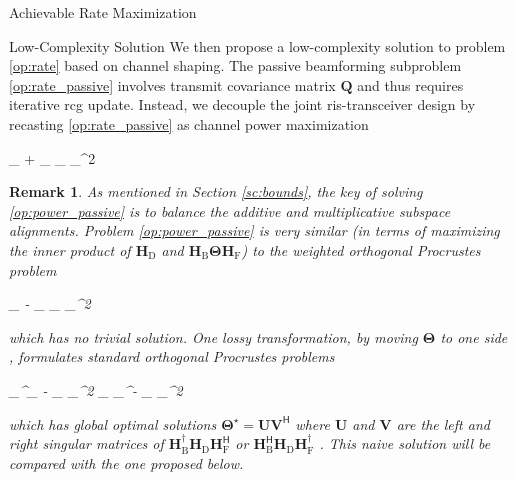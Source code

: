 \documentclass[journal]{IEEEtran}
\newtheorem{remark}{Remark}
\begin{document}
\begin{section}{Achievable Rate Maximization}
	\begin{subsection}{Low-Complexity Solution}\label{sc:low_complexity}
		We then propose a low-complexity solution to problem \eqref{op:rate} based on channel shaping.
		The passive beamforming subproblem \eqref{op:rate_passive} involves transmit covariance matrix $\mathbf{Q}$ and thus requires iterative \gls{rcg} update.
		Instead, we decouple the joint \gls{ris}-transceiver design by recasting \eqref{op:rate_passive} as channel power maximization
		\begin{maxi!}
			{\scriptstyle{\mathbf{\Theta}}}{\lVert {}_ + _ \mathbf{\Theta} _ \rVert _^2}{\label{op:power_passive}}{\label{ob:power_passive}}
		\end{maxi!}
		\begin{remark}
			As mentioned in Section \ref{sc:bounds}, the key of solving \eqref{op:power_passive} is to balance the additive and multiplicative subspace alignments.
			Problem \eqref{op:power_passive} is very similar (in terms of maximizing the inner product of $\mathbf{H}_\mathrm{D}$ and $\mathbf{H}_\mathrm{B} \mathbf{\Theta} \mathbf{H}_\mathrm{F}$) to the weighted orthogonal Procrustes problem \cite{Gower2004}
			\begin{mini!}
				{\scriptstyle{\mathbf{\Theta}}}{\lVert {}_ - _ \mathbf{\Theta} _\mathrm{F} \rVert _^2}{\label{op:weighted_orthogonal_procrustes}}{}
			\end{mini!}
			which has no trivial solution.
			One lossy transformation, by moving $\mathbf{\Theta}$ to one side \cite{Bell2003}, formulates standard orthogonal Procrustes problems
			\begin{mini!}
				{\scriptstyle{\mathbf{\Theta}}}{\lVert {}_^\dagger {}_ - \mathbf{\Theta} _\mathrm{F} \rVert _^2  \lVert \mathbf{H}_ _^\dagger - _ \mathbf{\Theta} \rVert _^2}{\label{op:standard_orthogonal_procrustes}}{}
				\addConstraint{\mathbf{\Theta}^\mathsf{H} \mathbf{\Theta}=\mathbf{I},}{}{}
			\end{mini!}
			which has global optimal solutions $\mathbf{\Theta}^\star = \mathbf{U} \mathbf{V}^\mathsf{H}$ where $\mathbf{U}$ and $\mathbf{V}$ are the left and right singular matrices of $\mathbf{H}_\mathrm{B}^\dagger \mathbf{H}_\mathrm{D} \mathbf{H}_\mathrm{F}^\mathsf{H}$ or $\mathbf{H}_\mathrm{B}^\mathsf{H} \mathbf{H}_\mathrm{D} \mathbf{H}_\mathrm{F}^\dagger$ \cite{Golub2013}.
			This naive solution will be compared with the one proposed below.
		\end{remark}


\end{subsection}
\end{section}
\end{document}
